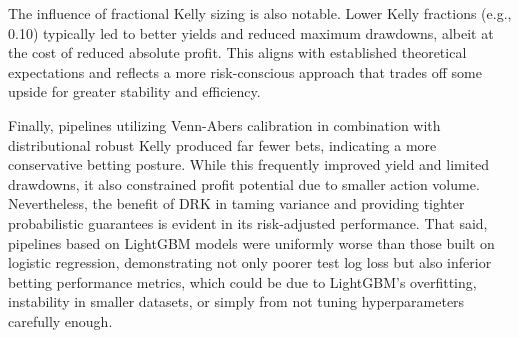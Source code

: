 \documentclass[12pt,twoside]{report}
\begin{document}
The influence of fractional Kelly sizing is also notable. Lower Kelly fractions (e.g., 0.10) typically led to better yields and reduced maximum drawdowns, albeit at the cost of reduced absolute profit. This aligns with established theoretical expectations and reflects a more risk-conscious approach that trades off some upside for greater stability and efficiency.

Finally, pipelines utilizing Venn-Abers calibration in combination with distributional robust Kelly produced far fewer bets, indicating a more conservative betting posture. While this frequently improved yield and limited drawdowns, it also constrained profit potential due to smaller action volume. Nevertheless, the benefit of DRK in taming variance and providing tighter probabilistic guarantees is evident in its risk-adjusted performance. That said, pipelines based on LightGBM models were uniformly worse than those built on logistic regression, demonstrating not only poorer test log loss but also inferior betting performance metrics, which could be due to LightGBM’s overfitting, instability in smaller datasets, or simply from not tuning hyperparameters carefully enough.
\end{document}
